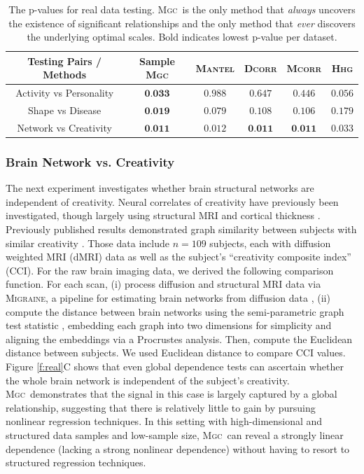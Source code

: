 \documentclass[11pt]{article}
\providecommand{\sct}[1]{{\normalfont\textsc{#1}}}
\newcommand{\Migraine}{\sct{Migraine}}
\newcommand{\Mgc}{\sct{Mgc}}
\newcommand{\Hhg}{\sct{Hhg}}
\newcommand{\Dcorr}{\sct{Dcorr}}
\newcommand{\Mcorr}{\sct{Mcorr}}
\newcommand{\Mantel}{\sct{Mantel}}
\begin{document}
\begin{table}[htbp]
\centering
\caption{The p-values for real data testing. \Mgc~is the only method that \emph{always} uncovers the existence of significant relationships and the only method that \emph{ever} discovers the underlying optimal scales. Bold indicates lowest p-value per dataset.}
\label{t:real}%
\begin{tabular}{|c||c|c|c|c|c|}
\hline
Testing Pairs / Methods & Sample \Mgc & \Mantel & \Dcorr & \Mcorr & \Hhg \\
\hline
Activity vs Personality & $\textbf{0.033}$  & $0.988$ & $0.647$ & $0.446$ & $0.056$ \\
\hline
Shape vs Disease & $\textbf{0.019}$  & $0.079$ & $0.108$ & $0.106$ & $0.179$ \\
\hline
Network vs Creativity & $\textbf{0.011}$  & ${0.012}$ & $\textbf{0.011}$ & $\textbf{0.011}$ & ${0.033}$ \\
\hline
\end{tabular}
\end{table}

\subsubsection*{Brain Network vs. Creativity}

The next experiment investigates whether brain structural networks are independent of creativity.  Neural correlates of creativity have previously been investigated, though largely using structural MRI and cortical thickness \cite{Jung2009}.  Previously published results demonstrated graph similarity between subjects with similar creativity \cite{Koutra15a}. Those data include  $n=109$ subjects, each with diffusion weighted MRI (dMRI) data as well as the subject's ``creativity composite index'' (CCI).  
For the raw brain imaging data, we derived the following comparison function.  For each scan, (i) process diffusion and structural MRI data via  \Migraine, a pipeline for estimating brain networks from diffusion data \cite{GrayRoncal2013}, (ii) 
compute the distance between brain networks using the semi-parametric graph test statistic \cite{Sussman2013,ShenVogelsteinPriebe2016,Tang2016}, embedding each graph into two dimensions for simplicity and aligning the embeddings via a Procrustes analysis.  Then, compute the Euclidean distance between subjects. We used Euclidean distance to compare CCI values. 
% 
Figure \ref{f:real}{\color{magenta}C} shows that even global dependence tests can ascertain whether the whole brain network is independent of the subject's creativity.  \Mgc~demonstrates that the signal in this case is largely captured by a global relationship, suggesting that there is relatively little to gain by pursuing nonlinear regression techniques. In this setting with high-dimensional and structured data samples and low-sample size, \Mgc~can reveal a strongly linear dependence (lacking a strong nonlinear dependence) without having to resort to structured regression techniques.
\end{document}
